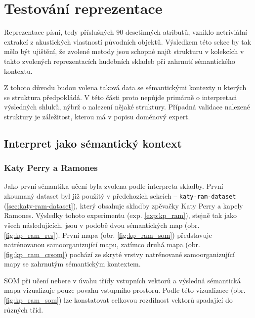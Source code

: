 \documentclass[thesis=M,czech]{FITthesis}[2012/06/26]
\begin{document}
\section{Testování reprezentace}
Reprezentace písní, tedy příslušných $90$ desetinných atributů, vzniklo netriviální extrakcí z akustických vlastností původních objektů. Výsledkem této sekce by tak mělo být ujištění, že zvolené metody jsou schopné najít strukturu v kolekcích v takto zvolených reprezentacích hudebních skladeb při zahrnutí sémantického kontextu.


Z tohoto důvodu budou volena taková data se sémantickými kontexty u kterých se struktura předpokládá. V této části proto nepůjde primárně o interpretaci výsledných shluků, nýbrž o nalezení nějaké struktury. Případná validace nalezené struktury je záležitost, kterou má v popisu doménový expert.




\subsection{Interpret jako sémantický kontext}
\subsubsection*{Katy Perry a Ramones}\label{sec:kat_ram}
Jako první sémantika učení byla zvolena podle interpreta skladby. První zkoumaný dataset byl již použitý v předchozích sekcích -- \texttt{katy-ram-dataset} (\ref{sec:katy-ram-dataset}), který obsahuje skladby zpěvačky Katy Perry a kapely Ramones. Výsledky  tohoto experimentu (exp. \ref{exp:kp_ram}), stejně tak jako všech následujících, jsou v podobě dvou sémantických map (obr. \ref{fig:kp_ram_res}). První mapa (obr. \ref{fig:kp_ram_som}) představuje natrénovanou samoorganizující mapu, zatímco druhá mapa (obr. \ref{fig:kp_ram_crsom}) pochází ze skryté vrstvy natrénované samoorganizující mapy se zahrnutým sémantickým kontextem.

	SOM při učení nebere v úvahu třídy vstupních vektorů a výsledná sémantická mapa vizualizuje pouze povahu vstupního prostoru. Podle této vizualizace (obr. \ref{fig:kp_ram_som}) lze konstatovat celkovou rozdílnost vektorů spadající do různých tříd.
	
\end{document}
